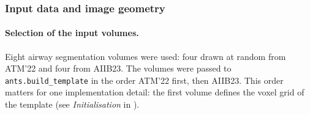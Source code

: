 \subsubsection{Input data and image geometry}
\label{sec:tpl_data}             %

\paragraph{Selection of the input volumes.}  %
Eight airway segmentation volumes were used: four drawn at random from ATM'22 and
four from AIIB23.
The volumes were passed to \texttt{ants.build\_template} in the order ATM'22
first, then AIIB23. This order matters for one implementation detail: the first
volume defines the voxel grid of the template (see \emph{Initialisation} in
).

